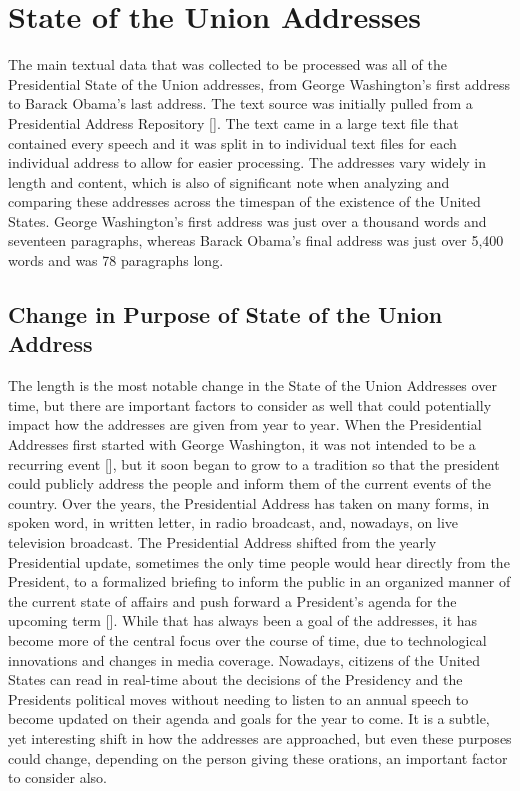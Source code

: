 \section{State of the Union Addresses}
The main textual data that was collected to be processed was all of the Presidential State of the Union addresses, from George Washington's first address to Barack Obama's last address.
The text source was initially pulled from a Presidential Address Repository [\cite{presrepo}].
The text came in a large text file that contained every speech and it was split in to individual text files for each individual address to allow for easier processing.
The addresses vary widely in length and content, which is also of significant note when analyzing and comparing these addresses across the timespan of the existence of the United States.
George Washington's first address was just over a thousand words and seventeen paragraphs, whereas Barack Obama's final address was just over 5,400 words and was 78 paragraphs long.

\subsection{Change in Purpose of State of the Union Address}
The length is the most notable change in the State of the Union Addresses over time, but there are important factors to consider as well that could potentially impact how the addresses are given from year to year.
When the Presidential Addresses first started with George Washington, it was not intended to be a recurring event [\cite{teten2003evolution}], but it soon began to grow to a tradition so that the president could publicly address the people and inform them of the current events of the country.
Over the years, the Presidential Address has taken on many forms, in spoken word, in written letter, in radio broadcast, and, nowadays, on live television broadcast.
The Presidential Address shifted from the yearly Presidential update, sometimes the only time people would hear directly from the President, to a formalized briefing to inform the public in an organized manner of the current state of affairs and push forward a President's agenda for the upcoming term [\cite{teten2003evolution}].
While that has always been a goal of the addresses, it has become more of the central focus over the course of time, due to technological innovations and changes in media coverage.
Nowadays, citizens of the United States can read in real-time about the decisions of the Presidency and the Presidents political moves without needing to listen to an annual speech to become updated on their agenda and goals for the year to come.
It is a subtle, yet interesting shift in how the addresses are approached, but even these purposes could change, depending on the person giving these orations, an important factor to consider also.

